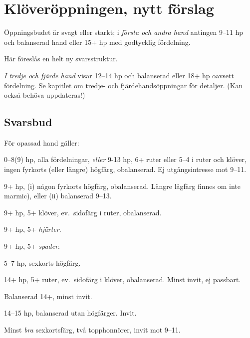 \chapter{Kl\"over\"oppningen, nytt förslag}

\"Oppningsbudet  \"ar svagt eller starkt; i {\em f\"orsta och andra hand}
antingen 9--11 hp och balanserad hand eller 15+ hp med godtycklig f\"ordelning.

Här föreslås en helt ny svarsstruktur.

{\em I tredje och fj{\"a}rde hand}
 visar  12--14 hp och balanserad eller 18+ hp oavsett fördelning.
Se kapitlet om tredje- och fj\"ardehands\"oppningar f\"or detaljer. (Kan
också behöva uppdateras!)

\section{Svarsbud}

F{\"o}r opassad hand g{\"a}ller:

\bbe
   \item[--\ru{1}] 0--8(9) hp, alla fördelningar, \emph{eller} 9-13 hp, 6+
     ruter eller 5--4 i ruter och klöver, ingen fyrkorts (eller längre)
     högfärg, obalanserad. Ej utgångsintresse mot 9--11.

   \item[--\hj{1}] 9+ hp, (i) någon fyrkorts högf\"arg, obalanserad. L\"angre
     l{\aa}gf\"arg finnes om inte marmic), eller (ii) balanserad 9--13.

   \item[--\spa{1}] 9+ hp, 5+ klöver, ev.\ sidofärg i ruter, obalanserad.
   \item[--\NT{1}] 9+ hp, 5+ \emph{hjärter}.
   \item[--\kl{2}] 9+ hp, 5+ \emph{spader}.

   \item[--\ru{2}] 5--7 hp, sexkorts högfärg.

   \item[--\hj{2}] 14+ hp, 5+ ruter, ev.\ sidofärg i klöver,
     obalanserad. Minst invit, ej passbart.
        
   \item[--\spa{2}] Balanserad 14+, minst invit.

   \item[--\NT{2}] 14--15 hp, balanserad utan h\"ogf\"arger. Invit.

   \item[--\la{3}] Minst {\em bra} sexkortsf\"arg, två
     topphonnörer,
                  invit mot 9--11.

